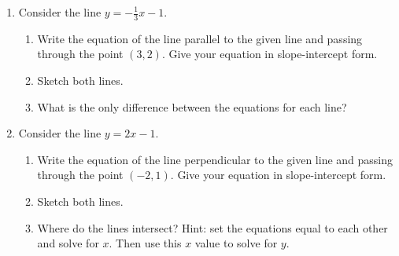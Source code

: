 \documentclass[12pt]{amsart}
\begin{document}
\begin{enumerate}
%
      
\item Consider the line $y=-\frac{1}{3}x-1$.
 \begin{enumerate}
     \item Write the equation of the line parallel to the given line and passing through the point $(3,2)$.  Give your equation in slope-intercept form.
      \item Sketch both lines.    
       \item What is the only difference between the equations for each line?
      \end{enumerate}
      

\item Consider the line $y=2x-1$.
 \begin{enumerate}
     \item Write the equation of the line perpendicular to the given line and passing through the point $(-2,1)$.  Give your equation in slope-intercept form.
      \item Sketch both lines.    
       \item Where do the lines intersect?  Hint: set the equations equal to each other and solve for $x$.  Then use this $x$ value to solve for $y$.
      \end{enumerate}
      


%


\end{enumerate}
\end{document}
